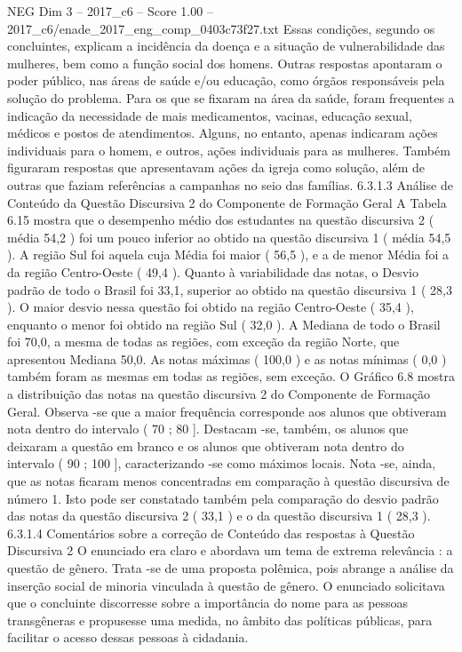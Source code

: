 \begin{textsample}{NEG Dim 3 – 2017\_c6 – Score 1.00 – 2017\_c6/enade\_2017\_eng\_comp\_0403c73f27.txt}
Essas condições, segundo os concluintes, explicam a incidência da doença e a situação de vulnerabilidade das mulheres, bem como a função social dos homens.
Outras respostas apontaram o poder público, nas áreas de saúde e/ou educação, como órgãos responsáveis pela solução do problema.
Para os que se fixaram na área da saúde, foram frequentes a indicação da necessidade de mais medicamentos, vacinas, educação sexual, médicos e postos de atendimentos.
Alguns, no entanto, apenas indicaram ações individuais para o homem, e outros, ações individuais para as mulheres.
Também figuraram respostas que apresentavam ações da igreja como solução, além de outras que faziam referências a campanhas no seio das famílias. 6.3.1.3 Análise de Conteúdo da Questão Discursiva 2 do Componente de Formação Geral A Tabela 6.15 mostra que o desempenho médio dos estudantes na questão discursiva 2 ( média 54,2 ) foi um pouco inferior ao obtido na questão discursiva 1 ( média 54,5 ).
A região Sul foi aquela cuja Média foi maior ( 56,5 ), e a de menor Média foi a da região Centro-Oeste ( 49,4 ).
Quanto à variabilidade das notas, o Desvio padrão de todo o Brasil foi 33,1, superior ao obtido na questão discursiva 1 ( 28,3 ).
O maior desvio nessa questão foi obtido na região Centro-Oeste ( 35,4 ), enquanto o menor foi obtido na região Sul ( 32,0 ).
A Mediana de todo o Brasil foi 70,0, a mesma de todas as regiões, com exceção da região Norte, que apresentou Mediana 50,0.
As notas máximas ( 100,0 ) e as notas mínimas ( 0,0 ) também foram as mesmas em todas as regiões, sem exceção.
O Gráfico 6.8 mostra a distribuição das notas na questão discursiva 2 do Componente de Formação Geral.
Observa -se que a maior frequência corresponde aos alunos que obtiveram nota dentro do intervalo ( 70 ; 80 ].
Destacam -se, também, os alunos que deixaram a questão em branco e os alunos que obtiveram nota dentro do intervalo ( 90 ; 100 ], caracterizando -se como máximos locais.
Nota -se, ainda, que as notas ficaram menos concentradas em comparação à questão discursiva de número 1.
Isto pode ser constatado também pela comparação do desvio padrão das notas da questão discursiva 2 ( 33,1 ) e o da questão discursiva 1 ( 28,3 ). 6.3.1.4 Comentários sobre a correção de Conteúdo das respostas à Questão Discursiva 2 O enunciado era claro e abordava um tema de extrema relevância : a questão de gênero.
Trata -se de uma proposta polêmica, pois abrange a análise da inserção social de minoria vinculada à questão de gênero.
O enunciado solicitava que o concluinte discorresse sobre a importância do nome para as pessoas transgêneras e propusesse uma medida, no âmbito das políticas públicas, para facilitar o acesso dessas pessoas à cidadania.

\end{textsample}

